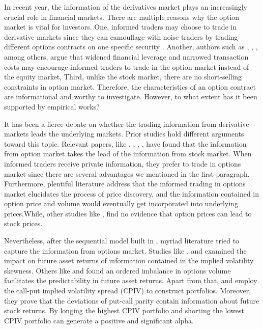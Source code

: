 
In recent year, the information of the derivatives market plays an increasingly crucial role in financial markets. There are multiple reasons why the option market is vital for investors. One, informed traders may choose to trade in derivative markets since they can camouflage with noise traders by trading different options contracts on one specific security \parencite{easley1998option}. Another, authors such as \textcite{black1973pricing}, \textcite{mayhew1995allocation}, \textcite{fleming1996trading}, among others, argue that widened financial leverage and narrowed transaction costs may encourage informed traders to trade in the option market instead of the equity market,
Third, unlike the stock market, there are no short-selling constraints in option market. Therefore, the characteristics of an option contract are informational and worthy to investigate. However, to what extent has it been supported by empirical works? 

It has been a fierce debate on whether the trading information from derivative markets leads the underlying markets. Prior studies hold different arguments toward this topic. Relevant papers, like \textcite{manaster1982option}, \textcite{anthony1988interrelation}, \textcite{chakravarty2004informed}, \textcite{cremers2010deviations}, \textcite{xing2010does} have found that the information from option market takes the lead of the information from stock market. When informed traders receive private information, they prefer to trade in options market since there are several advantages we mentioned in the first paragraph. Furthermore, plentiful literature address that the informed trading in options market elucidates the process of price discovery, and the information contained in option price and volume would eventually get incorporated into underlying prices.While, other studies like \textcite{chan1993option}, \textcite{stephan1990intraday} find no evidence that option prices can lead to stock prices. 

Nevertheless, after the sequential model built in \textcite{easley1998option}, myriad literature tried to capture the information from options market. Studies like \textcite{doran2007there}, \textcite{doran2010implications} and \textcite{atilgan2015implied} examined the impact on future asset returns of information contained in the implied volatility skewness. Others like \textcite{chan2002informational} and \textcite{pan2006information} found an ordered imbalance in options volume facilitates the predictability in future asset returns. Apart from that, \textcite{bali2009volatility} and \textcite{cremers2010deviations} employ the call-put implied volatility spread (CPIV) to construct portfolios. Moreover, they prove that the deviations of put-call parity contain information about future stock returns. By longing the highest CPIV portfolio and shorting the lowest CPIV portfolio can generate a positive and significant alpha.   

